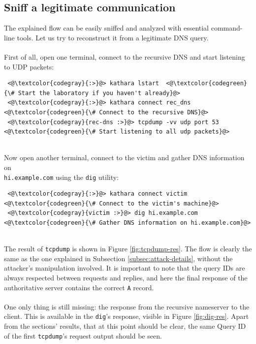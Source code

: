 \documentclass[11pt,a4paper]{article}
\begin{document}
\subsection{Sniff a legitimate communication}
The explained flow can be easily sniffed and analyzed with essential command-line tools. Let us try to reconstruct it from a legitimate DNS query.
\\
\\
\noindent
First of all, open one terminal, connect to the recursive DNS and start listening to UDP packets:
\begin{lstlisting}
 <@\textcolor{codegray}{:>}@> kathara lstart  <@\textcolor{codegreen}{\# Start the laboratory if you haven't already}@>
 <@\textcolor{codegray}{:>}@> kathara connect rec_dns <@\textcolor{codegreen}{\# Connect to the recursive DNS}@>
 <@\textcolor{codegray}{rec-dns :>}@> tcpdump -vv udp port 53    <@\textcolor{codegreen}{\# Start listening to all udp packets}@>
\end{lstlisting}
\noindent
\\
Now open another terminal, connect to the victim and gather DNS information on\\\texttt{hi.example.com} using the \texttt{dig} utility:
\begin{lstlisting}
 <@\textcolor{codegray}{:>}@> kathara connect victim <@\textcolor{codegreen}{\# Connect to the victim's machine}@>
 <@\textcolor{codegray}{victim :>}@> dig hi.example.com    <@\textcolor{codegreen}{\# Gather DNS information on hi.example.com}@>
\end{lstlisting}
\noindent
\\
The result of \texttt{tcpdump} is shown in Figure \ref{fig:tcpdump-res}. The flow is clearly the same as the one explained in Subsection \ref{subsec:attack-details}, without the attacker's manipulation involved. It is important to note that the query IDs are always respected between requests and replies, and here the final response of the authoritative server contains the correct \texttt{A} record.
\\
\\
\noindent
One only thing is still missing: the response from the recursive nameserver to the client. This is available in the \texttt{dig}'s response, visible in Figure \ref{fig:dig-res}. Apart from the sections' results, that at this point should be clear, the same Query ID of the first \texttt{tcpdump}'s request output should be seen.
\end{document}
